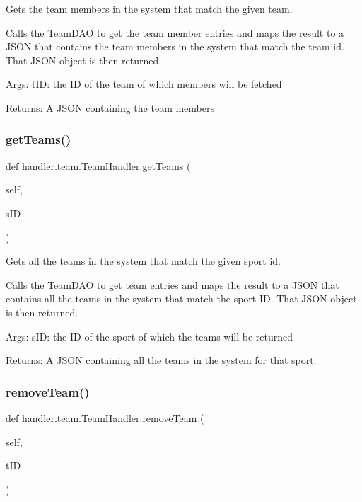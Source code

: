\begin{DoxyVerb}Gets the team members in the system that match the given team.  

Calls the TeamDAO to get the team member entries and maps the result
to a JSON that contains the team members in the system that match the team id.
That JSON object is then returned.

Args:
    tID: the ID of the team of which members will be fetched
    
Returns:
    A JSON containing the team members
\end{DoxyVerb}
 \mbox{\label{classhandler_1_1team_1_1_team_handler_aeb227f1fec1cfad96ce56cf7de054552}} 
\subsubsection{\texorpdfstring{get\+Teams()}{getTeams()}}
{\footnotesize\ttfamily def handler.\+team.\+Team\+Handler.\+get\+Teams (\begin{DoxyParamCaption}\item[{}]{self,  }\item[{}]{s\+ID }\end{DoxyParamCaption})}

\begin{DoxyVerb}Gets all the teams in the system that match the given sport id. 

Calls the TeamDAO to get team entries and maps the result
to a JSON that contains all the teams in the system that match the sport ID. That
JSON object is then returned.

Args:
    sID: the ID of the sport of which the teams will be returned
    
Returns:
    A JSON containing all the teams in the system for that sport.
\end{DoxyVerb}
 \mbox{\label{classhandler_1_1team_1_1_team_handler_abc55ff5f4532a8486f8c941876dc84ce}} 
\subsubsection{\texorpdfstring{remove\+Team()}{removeTeam()}}
{\footnotesize\ttfamily def handler.\+team.\+Team\+Handler.\+remove\+Team (\begin{DoxyParamCaption}\item[{}]{self,  }\item[{}]{t\+ID }\end{DoxyParamCaption})}

